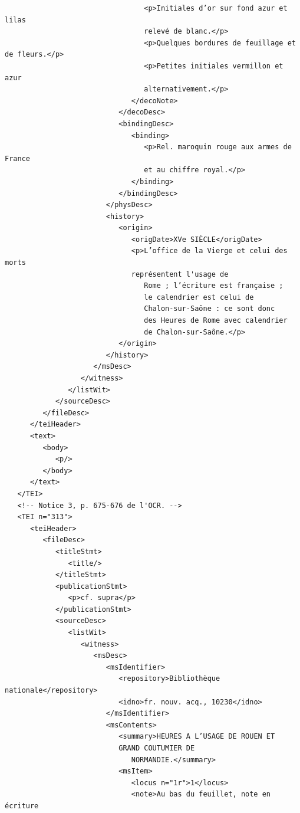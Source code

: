 \documentclass[a4paper,12pt,twoside]{book}
\begin{document}
\begin{verbatim}
                                 <p>Initiales d’or sur fond azur et lilas 
                                 relevé de blanc.</p>
                                 <p>Quelques bordures de feuillage et de fleurs.</p>
                                 <p>Petites initiales vermillon et azur 
                                 alternativement.</p>
                              </decoNote>
                           </decoDesc>
                           <bindingDesc>
                              <binding>
                                 <p>Rel. maroquin rouge aux armes de France 
                                 et au chiffre royal.</p>
                              </binding>
                           </bindingDesc>
                        </physDesc>
                        <history>
                           <origin>
                              <origDate>XVe SIÈCLE</origDate>
                              <p>L’office de la Vierge et celui des morts 
                              représentent l'usage de
                                 Rome ; l’écriture est française ; 
                                 le calendrier est celui de
                                 Chalon-sur-Saône : ce sont donc 
                                 des Heures de Rome avec calendrier
                                 de Chalon-sur-Saône.</p>
                           </origin>
                        </history>
                     </msDesc>
                  </witness>
               </listWit>
            </sourceDesc>
         </fileDesc>
      </teiHeader>
      <text>
         <body>
            <p/>
         </body>
      </text>
   </TEI>
   <!-- Notice 3, p. 675-676 de l'OCR. -->
   <TEI n="313">
      <teiHeader>
         <fileDesc>
            <titleStmt>
               <title/>
            </titleStmt>
            <publicationStmt>
               <p>cf. supra</p>
            </publicationStmt>
            <sourceDesc>
               <listWit>
                  <witness>
                     <msDesc>
                        <msIdentifier>
                           <repository>Bibliothèque nationale</repository>
                           <idno>fr. nouv. acq., 10230</idno>
                        </msIdentifier>
                        <msContents>
                           <summary>HEURES A L’USAGE DE ROUEN ET 
                           GRAND COUTUMIER DE
                              NORMANDIE.</summary>
                           <msItem>
                              <locus n="1r">1</locus>
                              <note>Au bas du feuillet, note en écriture

\end{verbatim}
\end{document}
